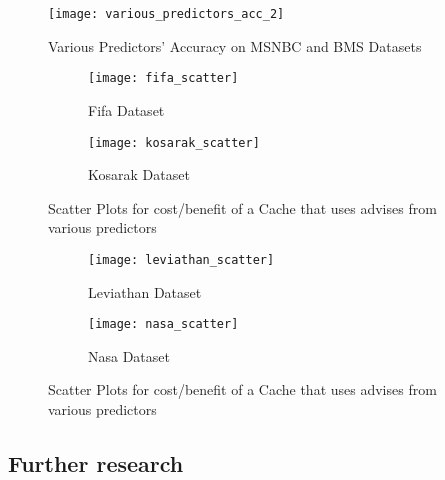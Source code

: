 \begin{figure}[h]
    \centering
    \texttt{[image: various\_predictors\_acc\_2]}
    \caption{Various Predictors' Accuracy on MSNBC and BMS Datasets}
    \label{fig:various_predictors_acc_2}
\end{figure}

\begin{figure}
\centering
\begin{subfigure}{.5\textwidth}
  \centering
  \texttt{[image: fifa\_scatter]}
  \caption{Fifa Dataset}
  \label{fig:scatter1_sub1}
\end{subfigure}%
\begin{subfigure}{.5\textwidth}
  \centering
  \texttt{[image: kosarak\_scatter]}
  \caption{Kosarak Dataset}
  \label{fig:scatter1_sub2}
\end{subfigure}
\caption{Scatter Plots for cost/benefit of a Cache that uses advises from various predictors}
\label{fig:scatter1}
\end{figure}

\begin{figure}
\centering
\begin{subfigure}{.5\textwidth}
  \centering
  \texttt{[image: leviathan\_scatter]}
  \caption{Leviathan Dataset}
  \label{fig:scatter2_sub1}
\end{subfigure}%
\begin{subfigure}{.5\textwidth}
  \centering
  \texttt{[image: nasa\_scatter]}
  \caption{Nasa Dataset}
  \label{fig:scatter2_sub2}
\end{subfigure}
\caption{Scatter Plots for cost/benefit of a Cache that uses advises from various predictors}
\label{fig:scatter2}
\end{figure}

\subsection{Further research}

